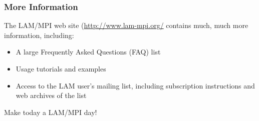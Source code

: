 \subsubsection{More Information}

The LAM/MPI web site (\url{http://www.lam-mpi.org/} contains much,
much more information, including:

\begin{itemize}
\item A large Frequently Asked Questions (FAQ) list
\item Usage tutorials and examples
\item Access to the LAM user's mailing list, including subscription
  instructions and web archives of the list
\end{itemize}

\noindent Make today a LAM/MPI day!

